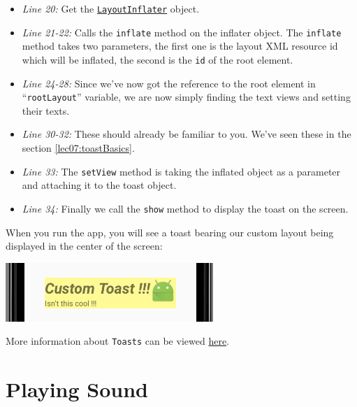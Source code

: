 \begin{itemize}
	\item \textit{Line 20:} Get the \href{https://developer.android.com/reference/android/view/LayoutInflater.html}{\texttt{LayoutInflater}} object.
	
	\item \textit{Line 21-22:} Calls the \texttt{inflate} method on the inflater object. The \texttt{inflate} method takes two parameters, the first one is the layout XML resource id which will be inflated, the second is the \texttt{id} of the root element.
	
	\item \textit{Line 24-28:} Since we've now got the reference to the root element in ``\texttt{rootLayout}'' variable, we are now simply finding the text views and setting their texts.
	
	\item \textit{Line 30-32:} These should already be familiar to you. We've seen these in the section \ref{lec07:toastBasics}.
	
	\item \textit{Line 33:} The \texttt{setView} method is taking the inflated object as a parameter and attaching it to the toast object.
	
	\item \textit{Line 34:} Finally we call the \texttt{show} method to display the toast on the screen.
	
\end{itemize}

When you run the app, you will see a toast bearing our custom layout being displayed in the center of the screen:

\begin{center}
	\includegraphics[scale=0.4]{chapters/ch06/images/21}
\end{center}

More information about \texttt{Toasts} can be viewed \href{https://developer.android.com/guide/topics/ui/notifiers/toasts.html}{here}.

\section{Playing Sound}

